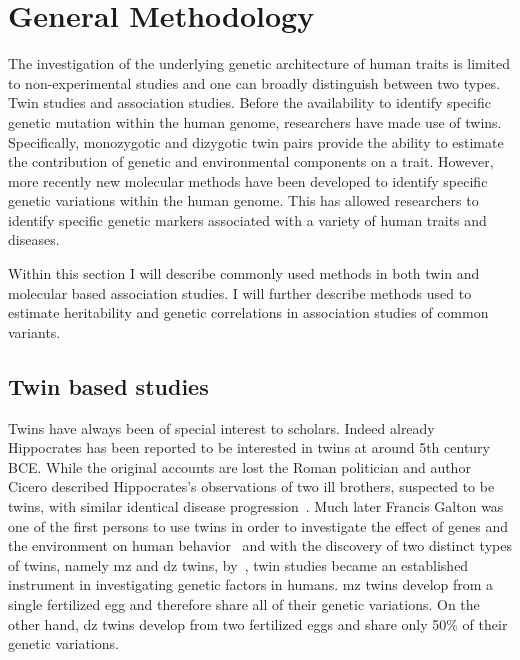 \chapter{General Methodology}
\label{cha:methods_applied_in_genetic_studies_on_humans}

The investigation of the underlying genetic architecture of human traits is limited to non-experimental studies and one can broadly distinguish between two types.
Twin studies and association studies.
Before the availability to identify specific genetic mutation within the human genome, researchers have made use of twins.
Specifically, monozygotic and dizygotic twin pairs provide the ability to estimate the contribution of genetic and environmental components on a trait.
However, more recently new molecular methods have been developed to identify specific genetic variations within the human genome.
This has allowed researchers to identify specific genetic markers associated with a variety of human traits and diseases.

Within this section I will describe commonly used methods in both twin and molecular based association studies.
I will further describe methods used to estimate heritability and genetic correlations in association studies of common variants.

\section{Twin based studies}
\label{sec:twin_based_studies}

Twins have always been of special interest to scholars.
Indeed already Hippocrates has been reported to be interested in twins at around 5th century BCE\@.
While the original accounts are lost the Roman politician and author Cicero described Hippocrates's observations of two ill brothers, suspected to be twins, with similar identical disease progression~\cite{Cicero44BC}.
Much later Francis Galton was one of the first persons to use twins in order to investigate the effect of genes and the environment on human behavior~\cite{Rende1990} and with the discovery of two distinct types of twins, namely \acrfull{mz} and \acrfull{dz} twins, by~\citet{Simens1924}, twin studies became an established instrument in investigating genetic factors in humans.
\acrfull{mz} twins develop from a single fertilized egg and therefore share all of their genetic variations.
On the other hand, \acrfull{dz} twins develop from two fertilized eggs and share only 50\% of their genetic variations.

